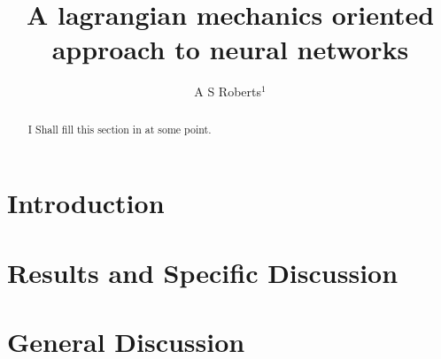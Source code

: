 \documentclass[10pt]{iopart}
\begin{document}
	\title[A lagrangian mechanics oriented approach to neural networks]{A lagrangian mechanics oriented approach to neural networks}
	\author{A S Roberts$^1$}
	\address{$^1$ Department of Physics, University of Bath, Claverton Down, Bath BA2 7AY, UK}
	
\begin{abstract}
I Shall fill this section in at some point.
\end{abstract}
\maketitle
\ioptwocol
\section{Introduction}
\section{Results and Specific Discussion}
\section{General Discussion}
\cite{Nobody06}




\end{document}
